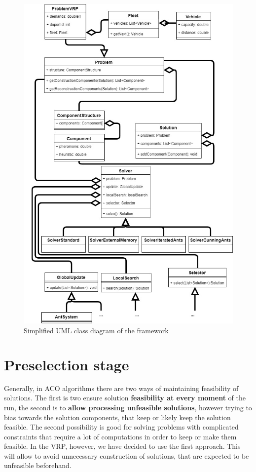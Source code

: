 \documentclass[12pt,a4paper,oneside]{book}
\begin{document}
\begin{figure}[H]
  \centering
    \includegraphics[scale=0.6]{uml-simple.jpg}
  \caption{Simplified UML class diagram of the framework}
  \label{fig:uml-simple}
\end{figure}

\section{Preselection stage}

Generally, in ACO algorithms there are two ways of maintaining feasibility of solutions. The first is two ensure solution \textbf{feasibility at every moment} of the run, the second is to \textbf{allow processing unfeasible solutions}, however trying to bias towards the solution components, that keep or likely keep the solution feasible. The second possibility is good for solving problems with complicated constraints that require a lot of computations in order to keep or make them feasible. In the VRP, however, we have decided to use the first approach. This will allow to avoid unnecessary construction of solutions, that are expected to be unfeasible beforehand. \par
\end{document}
